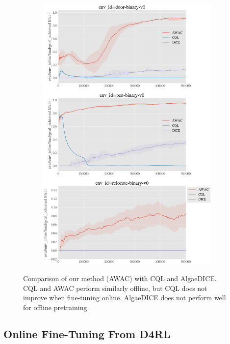 \documentclass[conference]{IEEEtran}
\begin{document}
\begin{figure}[H]
\begin{subfigure}[b]{0.49\textwidth}
    \end{subfigure}
    \begin{subfigure}[b]{0.49\textwidth}
        \center
        \includegraphics[width=\textwidth]{figures/iclrrebuttal/d4rl_hand_comparisons.png}
    \end{subfigure}
    \caption{Comparison of our method (AWAC) with CQL and AlgaeDICE. CQL and AWAC perform similarly offline, but CQL does not improve when fine-tuning online. AlgaeDICE does not perform well for offline pretraining. }
    \label{fig:cql-dice}
\end{figure}


\subsection{Online Fine-Tuning From D4RL}
\end{document}

